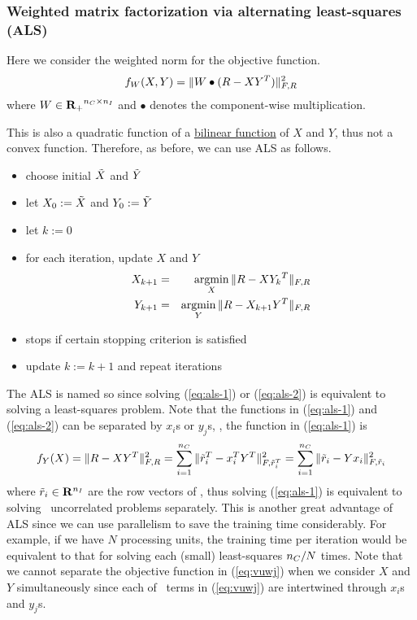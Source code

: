 \subsubsection{Weighted matrix factorization via alternating least-squares (ALS)}

Here we consider the weighted norm for the objective function.
\begin{equation}
\label{eq:vuwj}
f_W(X,Y) = \|W\bullet(R - XY^T)\|_{F,R}^2
\end{equation}
where $W\in{\mathbf{R}_+}^{{n_C}\times{n_I}}$
and $\bullet$ denotes the component-wise multiplication.

This is also a quadratic function of a \href{https://en.wikipedia.org/wiki/Bilinear_map}{bilinear function} of $X$ and $Y$,
thus not a convex function.
Therefore, as before, we can use ALS as follows.

\begin{itemize}
\item choose initial $\tilde{X}$ and $\tilde{Y}$
\item let ${{X}_{0}}:=\tilde{X}$ and ${{Y}_{0}}:=\tilde{Y}$
\item let $k:=0$
\item for each iteration, update $X$ and $Y$
\begin{eqnarray}
\label{eq:als-1}
    {{X}_{k+1}} &=& \mathop{\mathrm {argmin}}_X \|R-X{{{Y}_{k}}}^T\|_{F,R}
\\
\label{eq:als-2}
    {{Y}_{k+1}} &=& \mathop{\mathrm {argmin}}_Y \|R-{{X}_{k+1}}Y^T\|_{F,R}
\end{eqnarray}
\item stops if certain stopping criterion is satisfied
\item update $k:=k+1$ and repeat iterations
\end{itemize}

The ALS is named so since solving (\ref{eq:als-1}) or (\ref{eq:als-2}) is equivalent to solving a least-squares problem.
Note that the functions in (\ref{eq:als-1}) and (\ref{eq:als-2}) can be separated by $x_i$s or $y_j$s,
\eg, the function in (\ref{eq:als-1}) is
\begin{equation}
\label{eq:bian}
f_Y(X) = \|R - XY^T\|_{F,R}^2
= \sum_{i=1}^{{n_C}} \|\tilde{r}_i^T-x_i^T Y^T\|_{F,\tilde{r}_i^T}^2
= \sum_{i=1}^{{n_C}} \|\tilde{r}_i-Yx_i\|_{F,\tilde{r}_i}^2
\end{equation}
where $\tilde{r}_i \in\mathbf{R}^{{n_I}}$ are the row vectors of \ratmat,
thus solving (\ref{eq:als-1}) is equivalent to solving \numcus\ uncorrelated problems separately.
This is another great advantage of ALS since we can use parallelism to save the training time considerably.
For example, if we have $N$ processing units, the training time per iteration would be equivalent to
that for solving each (small) least-squares ${n_C}/N$ times.
Note that we cannot separate the objective function in (\ref{eq:vuwj}) when we consider $X$ and $Y$ simultaneously
since each of \numrating\ terms in (\ref{eq:vuwj}) are intertwined through $x_i$s and $y_j$s.

